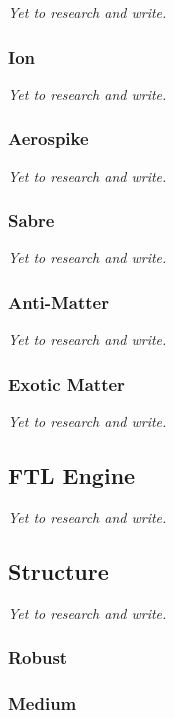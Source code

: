\textit{Yet to research and write.}

\subsubsection{Ion}

\textit{Yet to research and write.}

\subsubsection{Aerospike}

\textit{Yet to research and write.}

\subsubsection{Sabre}

\textit{Yet to research and write.}

\subsubsection{Anti-Matter}

\textit{Yet to research and write.}

\subsubsection{Exotic Matter}

\textit{Yet to research and write.}

\subsection{FTL Engine}

\textit{Yet to research and write.}

\subsection{Structure}

\textit{Yet to research and write.}

\subsubsection{Robust}

\subsubsection{Medium}

